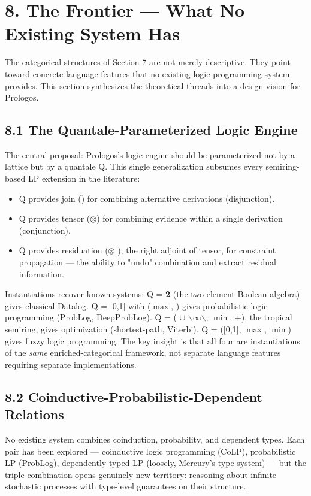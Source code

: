 \documentclass[11pt]{article}
\begin{document}
\section{8. The Frontier --- What No Existing System Has}
\label{sec:org8610738}

The categorical structures of Section 7 are not merely descriptive. They point toward concrete language features that no existing logic programming system provides. This section synthesizes the theoretical threads into a design vision for Prologos.
\subsection{8.1 The Quantale-Parameterized Logic Engine}
\label{sec:orge6084af}

The central proposal: Prologos's logic engine should be parameterized not by a lattice but by a quantale Q. This single generalization subsumes every semiring-based LP extension in the literature:

\begin{itemize}
\item Q provides join (\bigvee) for combining alternative derivations (disjunction).
\item Q provides tensor (\(\otimes\)) for combining evidence within a single derivation (conjunction).
\item Q provides residuation (\(\otimes\) \multimap), the right adjoint of tensor, for constraint propagation --- the ability to "undo" combination and extract residual information.
\end{itemize}

Instantiations recover known systems: Q = \textbf{2} (the two-element Boolean algebra) gives classical Datalog. Q = [0,1] with (\(\max\), \texttimes{}) gives probabilistic logic programming (ProbLog, DeepProbLog). Q = ( \(\cup\) $\backslash${\(\infty\)$\backslash$}, \(\min\), +), the tropical semiring, gives optimization (shortest-path, Viterbi). Q = ([0,1], \(\max\), \(\min\)) gives fuzzy logic programming. The key insight is that all four are instantiations of the \emph{same} enriched-categorical framework, not separate language features requiring separate implementations.
\subsection{8.2 Coinductive-Probabilistic-Dependent Relations}
\label{sec:orgfb42363}

No existing system combines coinduction, probability, and dependent types. Each pair has been explored --- coinductive logic programming (CoLP), probabilistic LP (ProbLog), dependently-typed LP (loosely, Mercury's type system) --- but the triple combination opens genuinely new territory: reasoning about infinite stochastic processes with type-level guarantees on their structure.
\end{document}
